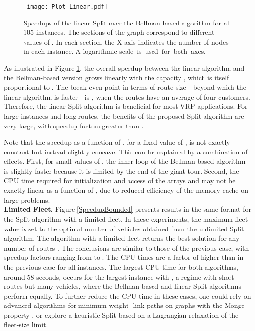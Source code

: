 \documentclass[11pt]{article}
\begin{document}
\begin{figure}[htbp]
\centering
\texttt{[image: Plot-Linear.pdf]}
\caption{Speedups of the linear Split over the Bellman-based algorithm for all 105 instances. The sections of the graph correspond to different values of . In each section, the X-axis indicates the number of nodes  in each instance. A logarithmic scale~is~used~for~both~axes.}
\label{SpeedupLinear}
\end{figure}

As illustrated in Figure \ref{SpeedupLinear}, the overall speedup between the linear algorithm and the Bellman-based version grows linearly with the capacity , which is itself proportional to . The break-even point in terms of route size---beyond which the linear algorithm is faster---is , when the routes have an average of four customers. Therefore, the linear Split algorithm is beneficial for most VRP applications. For large instances and long routes, the benefits of the proposed Split algorithm are very large, with speedup factors greater than .

Note that the speedup as a function of , for a fixed value of , is not exactly constant but instead slightly concave. This can be explained by a combination of effects. First, for small values of , the inner loop of the Bellman-based algorithm is slightly faster because it is limited by the end of the giant tour. Second, the CPU time required for initialization and access of the arrays  and  may not be exactly linear as a function of , due to reduced efficiency of the memory cache on large problems. \\

\textbf{Limited Fleet.}
Figure \ref{SpeedupBounded} presents results in the same format for the Split algorithm with a limited fleet. In these experiments, the maximum fleet value  is set to the optimal number of vehicles obtained from the unlimited Split algorithm. The algorithm with a limited fleet returns the best solution for any number of routes .
The conclusions are similar to those of the previous case, with speedup factors ranging from  to . The CPU times are a factor of  higher than in the previous case for all instances.
The largest CPU time for both algorithms, around 58 seconds, occurs for the largest instance with , a regime with short routes but many vehicles, where the Bellman-based and linear Split algorithms perform equally. 
To further reduce the CPU time in these cases, one could rely on advanced algorithms for minimum weight -link paths on graphs with the Monge property \citep{Aggarwal1994}, or explore a heuristic Split based on a Lagrangian relaxation of the fleet-size limit. \\
\end{document}
